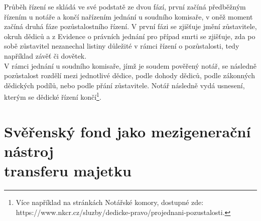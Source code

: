 \documentclass{article}
\begin{document}
Průběh řízení se skládá ve své podstatě ze dvou fází, první začíná předběžným řízením u notáře a končí nařízením jednání u soudního komisaře, v oněž moment začíná druhá fáze pozůstalostního řízení. V první fázi se zjišťuje jmění zůstavitele, okruh dědiců a z Evidence o právních jednání pro případ smrti se zjišťuje, zda po sobě zůstavitel nezanechal listiny důležité v rámci řízení o pozůstalosti, tedy například závěť či dovětek.\\

V rámci jednání u soudního komisaře, jímž je soudem pověřený notář, se následně pozůstalost rozdělí mezi jednotlivé dědice, podle dohody dědiců, podle zákonných dědických podílů, nebo podle přání zůstavitele. Notář následně vydá usnesení, kterým se dědické řízení končí\footnote{Více například na stránkách Notářské komory, dostupné zde: https://www.nkcr.cz/sluzby/dedicke-pravo/projednani-pozustalosti.}.\\




\newpage


\thispagestyle{smallertextinheader}

\section[Svěřenský fond jako mezigenerační nástroj transferu majetku]{Svěřenský fond jako mezigenerační nástroj\\ transferu majetku}
\end{document}
